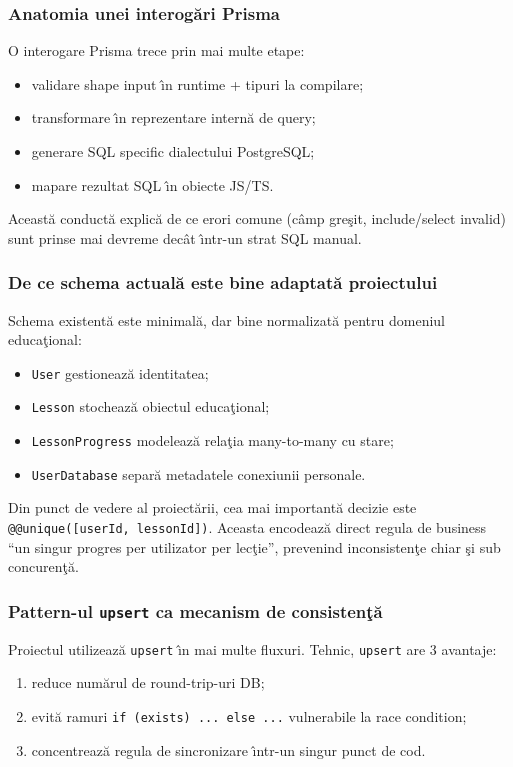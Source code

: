 \documentclass[12pt,onecolumn,draftclsnofoot]{IEEEtran}
\begin{document}
\subsubsection{Anatomia unei interog\u{a}ri Prisma}
O interogare Prisma trece prin mai multe etape:
\begin{itemize}
  \item validare shape input \^{\i}n runtime + tipuri la compilare;
  \item transformare \^{\i}n reprezentare intern\u{a} de query;
  \item generare SQL specific dialectului PostgreSQL;
  \item mapare rezultat SQL \^{\i}n obiecte JS/TS.
\end{itemize}

Aceast\u{a} conduct\u{a} explic\u{a} de ce erori comune (c\^{a}mp gre\c{s}it, include/select invalid) sunt prinse mai devreme dec\^{a}t \^{\i}ntr-un strat SQL manual.

\subsubsection{De ce schema actual\u{a} este bine adaptat\u{a} proiectului}
Schema existent\u{a} este minimal\u{a}, dar bine normalizat\u{a} pentru domeniul educa\c{t}ional:
\begin{itemize}
  \item \texttt{User} gestioneaz\u{a} identitatea;
  \item \texttt{Lesson} stocheaz\u{a} obiectul educa\c{t}ional;
  \item \texttt{LessonProgress} modeleaz\u{a} rela\c{t}ia many-to-many cu stare;
  \item \texttt{UserDatabase} separ\u{a} metadatele conexiunii personale.
\end{itemize}

Din punct de vedere al proiect\u{a}rii, cea mai important\u{a} decizie este \texttt{@@unique([userId, lessonId])}. Aceasta encodeaz\u{a} direct regula de business \enquote{un singur progres per utilizator per lec\c{t}ie}, prevenind inconsisten\c{t}e chiar \c{s}i sub concuren\c{t}\u{a}.

\subsubsection{Pattern-ul \texttt{upsert} ca mecanism de consisten\c{t}\u{a}}
Proiectul utilizeaz\u{a} \texttt{upsert} \^{\i}n mai multe fluxuri. Tehnic, \texttt{upsert} are 3 avantaje:
\begin{enumerate}[label=\alph*)]
  \item reduce num\u{a}rul de round-trip-uri DB;
  \item evit\u{a} ramuri \texttt{if (exists) ... else ...} vulnerabile la race condition;
  \item concentreaz\u{a} regula de sincronizare \^{\i}ntr-un singur punct de cod.
\end{enumerate}
\end{document}
